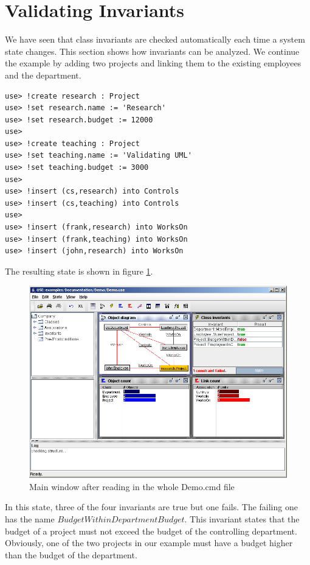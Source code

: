 \documentclass[a4paper,titlepage,oneside,final]{scrreprt} %
\begin{document}
\section{Validating Invariants}
We have seen that class invariants are checked automatically
each time a system state changes. This section shows how invariants can
be analyzed. We continue the example by adding two projects and
linking them to the existing employees and the department.
\begin{verbatim}
use> !create research : Project
use> !set research.name := 'Research'
use> !set research.budget := 12000
use>
use> !create teaching : Project
use> !set teaching.name := 'Validating UML'
use> !set teaching.budget := 3000
use>
use> !insert (cs,research) into Controls
use> !insert (cs,teaching) into Controls
use>
use> !insert (frank,research) into WorksOn
use> !insert (frank,teaching) into WorksOn
use> !insert (john,research) into WorksOn
\end{verbatim}
The resulting state is shown in figure \ref{fig:ViewsDemo}.
\begin{figure}[ht]
\centering
\includegraphics[scale=0.5]{Screenshots/GUI/ViewsDemo.png}
\caption{Main window after reading in the whole Demo.cmd file}
\label{fig:ViewsDemo}
\end{figure}
In this state, three of the four invariants
are true but one fails. The failing one has
the name $\mathit{BudgetWithinDepartmentBudget}$. This invariant states that
the budget of a project must not exceed the budget of the controlling department.
Obviously, one of the two projects in our example must
have a budget higher than the budget of the department.\\
\end{document}
